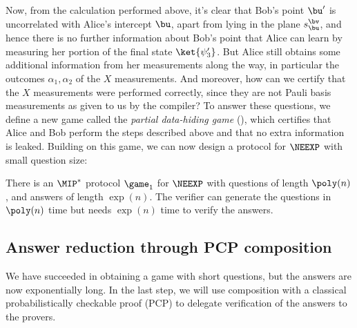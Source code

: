   Now, from the calculation performed above, it's clear that Bob's
  point $\bu'$ is uncorrelated with Alice's intercept $\bu$, apart
  from lying in the plane $s^{\bv}_{\bu}$, and hence there is no
  further information about Bob's point that Alice can learn by
  measuring her portion of the final state $\ket{\psi_3'}$. But Alice still obtains
  some additional information from her measurements along the way, in particular the
  outcomes $\alpha_1, \alpha_2$ of the $X$ measurements. And moreover,
  how can we certify that the $X$ measurements were performed
  correctly, since they are not Pauli basis measurements as given to
  us by the compiler? To answer these questions, we define a new game
  called the \emph{partial data-hiding game} (), which certifies that
  Alice and Bob perform the steps described above and that no
  extra information is leaked. Building on this game, we can now
  design a protocol for $\NEEXP$ with small question size:

 \begin{infthm}\label{thm:small-quest}
There is an $\MIP^*$ protocol $\game_{1}$ for $\NEEXP$ with questions
of length $\poly(n)$, and answers of length $\exp(n)$. The verifier can
generate the questions in $\poly(n)$ time but needs $\exp(n)$ time to
verify the answers.
\end{infthm}

\subsection{Answer reduction through PCP composition}
We have succeeded in obtaining a game with short questions, but the
answers are now exponentially long. In the last step, we will use
composition with a classical probabilistically checkable proof (PCP)
to delegate verification of the answers to the provers.

